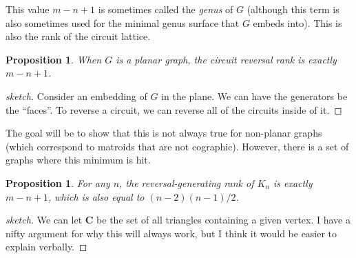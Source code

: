 \documentclass[12p]{amsart}
\numberwithin{equation}{section}
\theoremstyle{plain}
\newtheorem{prop}[thm]{Proposition}
\theoremstyle{definition}
\begin{document}
This value $m-n+1$ is sometimes called the \emph{genus} of $G$ (although this term is also sometimes used for the minimal genus surface that $G$ embeds into). This is also the rank of the circuit lattice. 

\begin{prop}
    When $G$ is a planar graph, the circuit reversal rank is exactly $m-n+1$. 
\end{prop}
\begin{proof}[sketch] Consider an embedding of $G$ in the plane. We can have the generators be the ``faces''. To reverse a circuit, we can reverse all of the circuits inside of it. 
\end{proof}

The goal will be to show that this is not always true for non-planar graphs (which correspond to matroids that are not cographic). However, there is a set of graphs where this minimum is hit. 

\begin{prop}
    For any $n$, the reversal-generating rank of $K_n$ is exactly $m-n+1$, which is also equal to $(n-2)(n-1)/2$. 
\end{prop}
\begin{proof}[sketch] We can let $\mathbf C$ be the set of all triangles containing a given vertex. I have a nifty argument for why this will always work, but I think it would be easier to explain verbally. 
\end{proof}
\end{document}
